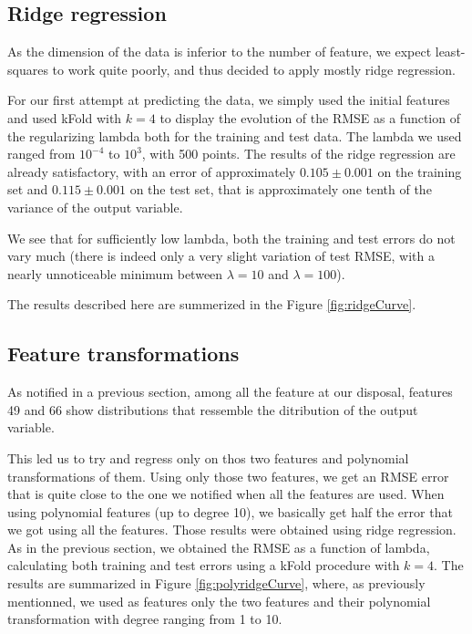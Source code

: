 \documentclass{article} %
\begin{document}
\begin{figure}[!t]
{\label{fig:xhist49}}
\hspace*{0.3in}
\caption{}
\end{figure}

\subsection{Ridge regression}
As the dimension of the data is inferior to the number of feature, we expect
least-squares to work quite poorly, and thus decided to apply mostly ridge
regression.

For our first attempt at predicting the data, we simply used the initial
features and used kFold with $k=4$ to display the evolution of the RMSE as a
function of the regularizing lambda both for the training and test data. 
The lambda we used ranged from $10^{-4}$ to
$10^3$, with 500 points. The results of the ridge regression are already
satisfactory, with an error of approximately $0.105\pm0.001$ on the training set
and $0.115\pm0.001$ on the test set, that is approximately one tenth of the
variance of the output variable.

We see that for sufficiently low lambda, both the training and test errors do
not vary much (there is indeed only a very slight variation of test RMSE, with a
nearly unnoticeable minimum between $\lambda=10$ and $\lambda=100$).

The results described here are summerized in the Figure \ref{fig:ridgeCurve}.

\subsection{Feature transformations}
As notified in a previous section, among all the feature at our disposal,
features 49 and 66 show distributions that ressemble the ditribution of the
output variable. 

This led us to try and regress only on thos two features and polynomial
transformations of them. Using only those two features, we get an RMSE error
that is quite close to the one we notified when all the features are used. When
using polynomial features (up to degree 10), we basically get half the error
that we got using all the features. Those results were obtained using ridge
regression. As in the previous section, we obtained the RMSE as a function of
lambda, calculating both training and test errors using a kFold procedure with
$k=4$. The results are summarized in Figure \ref{fig:polyridgeCurve}, where, as
previously mentionned, we used as features only the two features and their
polynomial transformation with degree ranging from 1 to 10.
\end{document}
